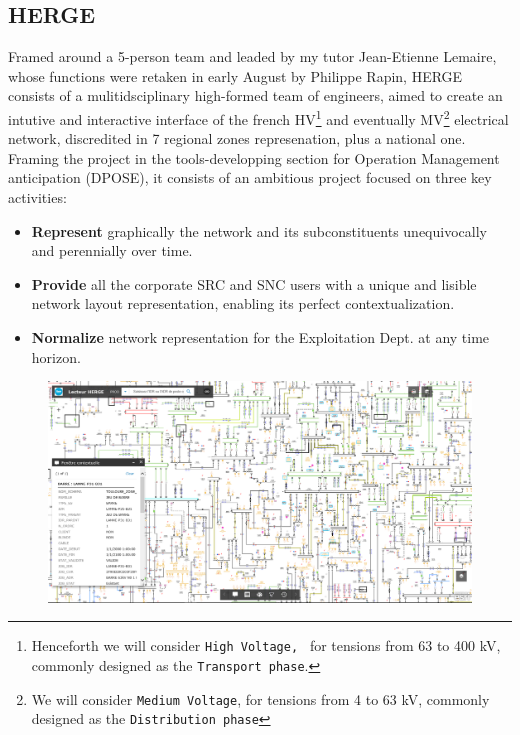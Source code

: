 \subsection{HERGE}
\label{sec:Intro:thesis-purpose:HERGE}

Framed around a 5-person team and leaded by my tutor Jean-Etienne Lemaire, whose functions were retaken in early August by Philippe Rapin, HERGE consists of a mulitidsciplinary high-formed team of engineers, aimed to create an intutive and interactive interface of the french HV\footnote{Henceforth we will consider \texttt{High Voltage, } for tensions from 63 to 400 kV, commonly designed as the \texttt{Transport phase}.} and eventually MV\footnote{We will consider \texttt{Medium Voltage}, for tensions from 4 to 63 kV, commonly designed as the \texttt{Distribution phase}} electrical network, discredited in 7 regional zones represenation, plus a national one.
Framing the project in the tools-developping section for Operation Management anticipation (DPOSE), it consists of an ambitious project focused on three key activities:
\begin{itemize}
    \item \textbf{Represent} graphically the network and its subconstituents unequivocally and perennially over time.
    \item\textbf{Provide} all the corporate SRC and SNC users with a unique and lisible network layout representation, enabling its perfect contextualization.
    \item \textbf{Normalize} network representation for the Exploitation Dept. at any time horizon.
\end{itemize}

\begin{figure}[h]
    \centering
    \parbox[t]{1\textwidth}{
    \href{https://herge-portal.rte-france.com/arcgis/apps/webappviewer/index.html?id=84a7af442f014844bd95939ce3c0067a}{\includegraphics[width=1\textwidth]{0.figuras/HERGE_interface.png}}
    }
    \label{fig:herge}
\end{figure}

